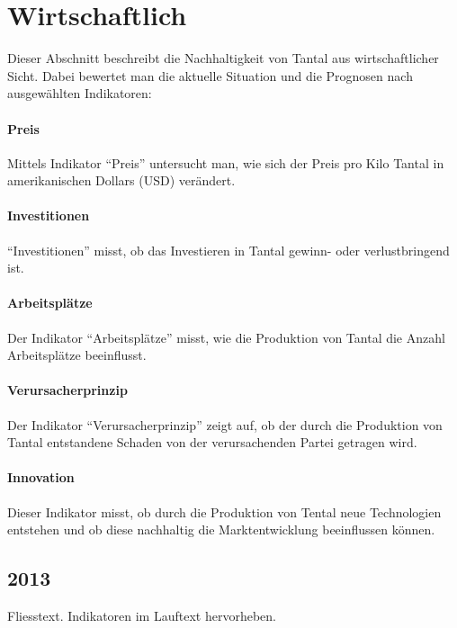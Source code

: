 
\section{Wirtschaftlich}\label{sec:conflict}
Dieser Abschnitt beschreibt die Nachhaltigkeit von Tantal aus wirtschaftlicher
Sicht. Dabei bewertet man die aktuelle Situation und die Prognosen nach
ausgewählten Indikatoren:

\paragraph{Preis}
Mittels Indikator ``Preis'' untersucht man, wie sich der Preis pro Kilo Tantal
in amerikanischen Dollars (USD) verändert.

\paragraph{Investitionen}
``Investitionen'' misst, ob das Investieren in Tantal gewinn- oder
verlustbringend ist.

\paragraph{Arbeitsplätze}
Der Indikator ``Arbeitsplätze'' misst, wie die Produktion von Tantal die Anzahl
Arbeitsplätze beeinflusst.

\paragraph{Verursacherprinzip}
Der Indikator ``Verursacherprinzip'' zeigt auf, ob der durch die Produktion von
Tantal entstandene Schaden von der verursachenden Partei getragen wird.

\paragraph{Innovation}
Dieser Indikator misst, ob durch die Produktion von Tental neue Technologien
entstehen und ob diese nachhaltig die Marktentwicklung beeinflussen können.

\subsection{2013}
Fliesstext. Indikatoren im Lauftext hervorheben.

